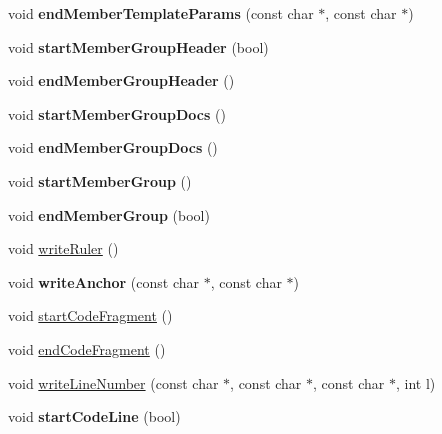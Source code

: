 \begin{DoxyCompactItemize}
\item 
\hypertarget{class_man_generator_ab9823a1d24c83284ff21781c8caa8487}{void {\bfseries end\-Member\-Template\-Params} (const char $\ast$, const char $\ast$)}\label{class_man_generator_ab9823a1d24c83284ff21781c8caa8487}

\item 
\hypertarget{class_man_generator_ab9d164d85715527cff385a3d599ccf7b}{void {\bfseries start\-Member\-Group\-Header} (bool)}\label{class_man_generator_ab9d164d85715527cff385a3d599ccf7b}

\item 
\hypertarget{class_man_generator_a7e1a44a13d8b22dc7929a9cdbd94b725}{void {\bfseries end\-Member\-Group\-Header} ()}\label{class_man_generator_a7e1a44a13d8b22dc7929a9cdbd94b725}

\item 
\hypertarget{class_man_generator_aa8c7357f48d452ccd00a331623c4674a}{void {\bfseries start\-Member\-Group\-Docs} ()}\label{class_man_generator_aa8c7357f48d452ccd00a331623c4674a}

\item 
\hypertarget{class_man_generator_a0e63ff5117b5bd3305323117412c6ff1}{void {\bfseries end\-Member\-Group\-Docs} ()}\label{class_man_generator_a0e63ff5117b5bd3305323117412c6ff1}

\item 
\hypertarget{class_man_generator_a00a5eb19d218888ab778e3a2805f78a6}{void {\bfseries start\-Member\-Group} ()}\label{class_man_generator_a00a5eb19d218888ab778e3a2805f78a6}

\item 
\hypertarget{class_man_generator_af7073e7872d1d67efd015ff1855c8b02}{void {\bfseries end\-Member\-Group} (bool)}\label{class_man_generator_af7073e7872d1d67efd015ff1855c8b02}

\item 
void \hyperlink{class_man_generator_a9fd641c75c5b5ee59a974c3b476584c2}{write\-Ruler} ()
\item 
\hypertarget{class_man_generator_aefb2abba9c0550fb151db55e044bb6fc}{void {\bfseries write\-Anchor} (const char $\ast$, const char $\ast$)}\label{class_man_generator_aefb2abba9c0550fb151db55e044bb6fc}

\item 
void \hyperlink{class_man_generator_a631953fed580c2b82e39426604c928ac}{start\-Code\-Fragment} ()
\item 
void \hyperlink{class_man_generator_a0d97d57c34ed239bcf916104a71e10bf}{end\-Code\-Fragment} ()
\item 
void \hyperlink{class_man_generator_a041516b65f9f2c22d2c0941419200cbb}{write\-Line\-Number} (const char $\ast$, const char $\ast$, const char $\ast$, int l)
\item 
\hypertarget{class_man_generator_aa76dc2000bd743981f13bb8953b51499}{void {\bfseries start\-Code\-Line} (bool)}\label{class_man_generator_aa76dc2000bd743981f13bb8953b51499}


\end{DoxyCompactItemize}
